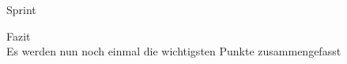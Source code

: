 
\begin{frame}[c]{Sprint}

  \begin{center}
    Fazit\\
    Es werden nun noch einmal die wichtigsten Punkte zusammengefasst
  \end{center}

\end{frame}
